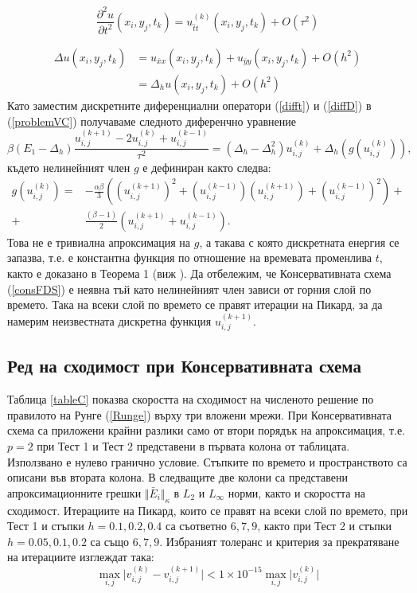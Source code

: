 \documentclass{article}
\newcommand{\be}{\begin{equation}}
\newcommand{\ee}{\end{equation}}
\newcommand{\rf}[1]{(\ref{#1})}
\begin{document}
\be\label{difft}
\frac{\partial^2 u}{\partial t^2}(x_i, y_j, t_k ) = u^{(k)}_{\bar{t}t}(x_i, y_j, t_k ) + O(\tau^2) 
\ee

\begin{align}\label{diffD}
\Delta u(x_i, y_j, t_k )  &= u_{\bar{x}x}(x_i, y_j, t_k ) +  u_{\bar{y}y}(x_i, y_j, t_k ) +  O(h^2)  \nonumber\\
			      &= \Delta_h u(x_i, y_j, t_k ) +  O(h^2) 
\end{align}
Като заместим дискретните диференциални оператори \rf{difft} и \rf{diffD} в \rf{problemVC} получаваме следното диференчно уравнение
\be\label{consFDS}
\beta (E_1-\Delta_h)\frac{ u^{(k+1)}_{i, j} - 2u^{(k)}_{i,j} + u^{(k-1)}_{i,j} }{\tau^2} = (\Delta_h - \Delta_h^2)u^{(k)}_{i,j} + \Delta_h(g(u^{(k)}_{i,j})),
\ee
%
където нелинейният член $g$ е дефиниран както следва:
\begin{align}
g(u^{(k)}_{i,j})=& -\frac{\alpha \beta} { 3 } \left( (u^{(k+1)}_{i,j})^2 + (u^{(k-1)}_{i,j})(u^{(k+1)}_{i,j}) + (u^{(k-1)}_{i,j})^2 \right) + \nonumber\\
+&\frac{ (\beta - 1 )}{ 2 }\left( u^{(k+1)}_{i,j} + u^{(k-1)}_{i,j} \right).
\end{align}
Това не е тривиална апроксимация на $g$, а такава с която дискретната енергия се запазва, т.е. е константна функция по отношение на времевата променлива $t$, както е доказано в Теорема 1 (виж \cite{ref20}). Да отбележим, че Консервативната схема \rf{consFDS} е неявна тъй като нелинейният член зависи от горния слой по времето. Така на всеки слой по времето се правят итерации на Пикард, за да намерим неизвестната дискретна функция $u^{(k+1)}_{i,j}$.

\subsection{Ред на сходимост при Консервативната схема}
Таблица \ref{tableC} показва скоростта на сходимост на численото решение по правилото на Рунге \rf{Runge} върху три вложени мрежи. При Консервативната схема са приложени крайни разлики само от втори порядък на апроксимация, т.е. $p=2$ при Тест 1 и Тест 2 представени в първата колона от таблицата. Използвано е нулево гранично условие. Стъпките по времето и пространството са описани във втората колона. В следващите две колони са представени апроксимационните грешки  $\Vert \bar E_i \Vert_\kappa$ в $L_2$ и $L_{\infty}$ норми, както и скоростта на сходимост. Итерациите на Пикард, които се правят на всеки слой по времето, при Тест 1 и стъпки $h=0.1, 0.2, 0.4$ са съответно $6, 7, 9$, както при Тест 2 и стъпки $h=0.05, 0.1, 0.2$ са също $6, 7, 9$. Избраният толеранс и критерия за прекратяване на итерациите изглеждат така:
\be
\max_{i,j} \vert v_{i,j}^{(k)} - v_{i,j}^{(k+1)} \vert < 1 \times 10^{-15} \max_{i,j} \vert v_{i,j}^{(k)} \vert
\ee
\end{document}
